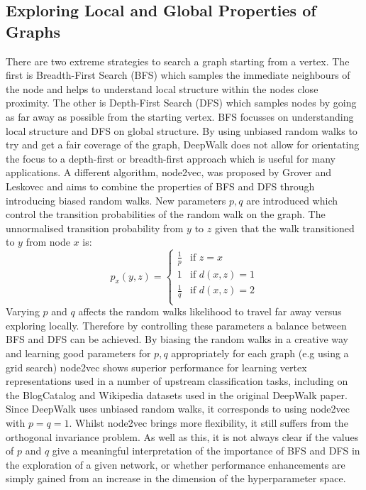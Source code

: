 \documentclass[a4paper]{article}
\begin{document}
\subsection{Exploring Local and Global Properties of Graphs}
There are two extreme strategies to search a graph starting from a vertex. The
first is Breadth-First Search (BFS) which samples the immediate neighbours of
the node and helps to understand local structure within the nodes close
proximity. The other is Depth-First Search (DFS) which samples nodes by going as
far away as possible from the starting vertex. BFS focusses on understanding
local structure and DFS on global structure. By using unbiased random walks to
try and get a fair coverage of the graph, DeepWalk does not allow for
orientating the focus to a depth-first or breadth-first approach which is useful
for many applications. A different algorithm, node2vec, was proposed by Grover
and Leskovec\cite{grover_leskovec2016} and aims to combine the
properties of BFS and DFS through introducing biased random walks. New
parameters $p,q$ are introduced which control the transition probabilities of
the random walk on the graph. The unnormalised transition probability from $y$
to $z$ given that the walk transitioned to $y$ from node $x$ is:
\begin{equation}
  p_x(y,z)= 
  \begin{cases}
    \frac{1}{p}& \text{if } z = x\\
    1          & \text{if } d(x,z) = 1\\
    \frac{1}{q}& \text{if } d(x,z) = 2\\
  \end{cases}
\end{equation}
Varying $p$ and $q$ affects the random walks likelihood to travel far away
versus exploring locally. Therefore by controlling these parameters a balance
between BFS and DFS can be achieved. By biasing the random walks in a creative
way and learning good parameters for $p,q$ appropriately for each graph (e.g
using a grid search) node2vec shows superior performance for learning vertex
representations used in a number of upstream classification tasks, including on
the BlogCatalog and Wikipedia datasets used in the original DeepWalk paper.\\
Since DeepWalk uses unbiased random walks, it corresponds to using node2vec with $p=q=1$. Whilst node2vec brings
more flexibility, it still suffers from the orthogonal invariance problem. As well as this, it is not always clear if the values of $p$ and $q$ give a
meaningful interpretation of the importance of BFS and DFS in the exploration of a given network, or whether
performance enhancements are simply gained from an increase in the dimension of the hyperparameter space.
\end{document}
